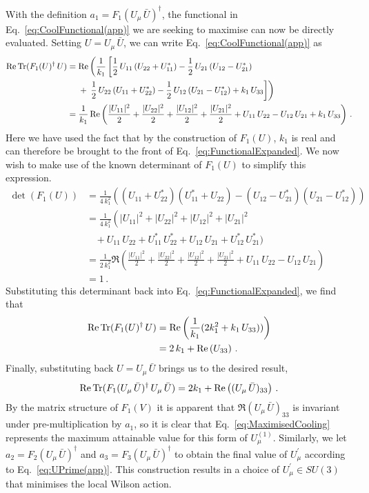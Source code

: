 With the definition $a_1 = F_1(U_\mu\,\bar{U})^\dagger$, the functional in Eq.~\eqref{eq:CoolFunctional(app)} we are seeking to maximise can now be directly evaluated. Setting $U = U_\mu\,\bar{U}$, we can write Eq.~\eqref{eq:CoolFunctional(app)} as 
%
\begin{align}
\operatorname{Re}\operatorname{Tr}(F_1(U)^\dagger\, U) &=\operatorname{Re} \left(\frac{1}{k_1}\left[ \frac{1}{2}\,U_{11} \left(U_{22} + U_{11}^*\right) - \frac{1}{2}\,U_{21} \left(U_{12} - U_{21}^*\right)\right.\right.\nonumber\\
&~~~~+ \left. \left.\frac{1}{2}\,U_{22} \left(U_{11} + U_{22}^*\right)
- \frac{1}{2}\,U_{12} \left(U_{21} - U_{12}^*\right) +k_1\,U_{33}\right]\right)\nonumber\\
&= \frac{1}{k_1}\operatorname{Re}\left(\frac{|U_{11}|^2}{2} + \frac{|U_{22}|^2}{2} + \frac{|U_{12}|^2}{2} + \frac{|U_{21}|^2}{2} + U_{11}\,U_{22} - U_{12}\,U_{21} + k_1\,U_{33}\right)\, .\label{eq:FunctionalExpanded}
\end{align}
%
Here we have used the fact that by the construction of $F_1(U)$, $k_1$ is real and can therefore be brought to the front of Eq.~\eqref{eq:FunctionalExpanded}. We now wish to make use of the known determinant of $F_1(U)$ to simplify this expression.
%
\begin{align}
\det(F_1(U)) &= \frac{1}{4\,k_1^2} \left(\left(U_{11}+ U_{22}^*\right)\left(U_{11}^* + U_{22}\right)-\left(U_{12} - U_{21}^*\right)\left( U_{21} - U_{12}^*\right)\right)\nonumber\\
&=\frac{1}{4\,k_1^2}\left( |U_{11}|^2 + |U_{22}|^2 + |U_{12}|^2 + |U_{21}|^2\right.\\
&~~~~+ U_{11}\,U_{22} + U_{11}^*\,U_{22}^* + U_{12}\,U_{21} + U_{12}^*\,U_{21}^*\big)\nonumber\\
&= \frac{1}{2\,k_1^2}\Re\left(\frac{|U_{11}|^2}{2} + \frac{|U_{22}|^2}{2} + \frac{|U_{12}|^2}{2} + \frac{|U_{21}|^2}{2} + U_{11}\,U_{22} - U_{12}\,U_{21}\right)\nonumber\\
&=1\, .
\end{align}
%
Substituting this determinant back into Eq.~\eqref{eq:FunctionalExpanded}, we find that
%
\begin{align}
\operatorname{Re}\operatorname{Tr}(F_1(U)^\dagger\, U) &= \operatorname{Re}\left(\frac{1}{k_1}(2k_1^2 + k_1\,U_{33}))\right)\nonumber\\
&=2\,k_1 + \operatorname{Re}\left(U_{33}\right)\, .
\end{align}
%
Finally, substituting back $U = U_\mu\,\bar{U}$ brings us to the desired result,
%
\begin{equation}
\operatorname{Re} \operatorname{Tr} (F_1(U_\mu\,\bar{U})^\dagger \, U_\mu \, \bar{U}) = 2k_1 + \operatorname{Re}\left( (U_\mu\, \bar{U})_{33}\right)\, .
\label{eq:MaximisedCooling}
\end{equation}
%
By the matrix structure of $F_1(V)$ it is apparent that $\Re(U_\mu\, \bar{U})_{33}$ is invariant under pre-multiplication by $a_1$, so it is clear that Eq.~\eqref{eq:MaximisedCooling} represents the maximum attainable value for this form of $U^{(1)}_\mu$. Similarly, we let $a_2=F_2(U_\mu\,\bar{U})^\dagger$ and $a_3=F_3(U_\mu\,\bar{U})^\dagger$ to obtain the final value of $U^\prime_\mu$ according to Eq.~\eqref{eq:UPrime(app)}. This construction results in a choice of $U_\mu^\prime \in SU(3)$ that minimises the local Wilson action.